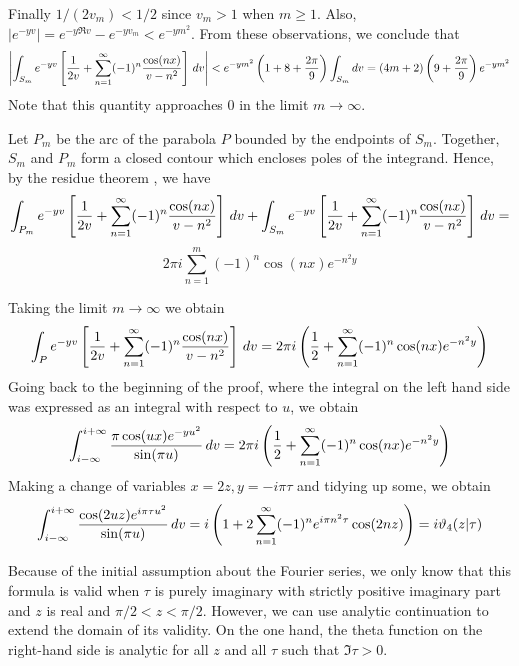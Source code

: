 \documentclass[12pt]{article}
\begin{document}
Finally $1/(2 v_m) < 1/2$ since $v_m > 1$ when $m \ge 1$.  Also, $|e^{-y v}| = e^{-y \Re v} - e^{-y v_m} < e^{-y m^2}$.  From these observations, we conclude that
 $$\left| \int_{S_m} e^{-y v} \left[ {1 \over 2 v} + \sum_{n=1}^\infty (-1)^n {\cos(nx)\over v - n^2} \right] \, dv \right| < e^{-y m^2} \left( 1 + 8 + {2 \pi \over 9} \right) \int_{S_m} dv = (4m + 2) \left( 9 + {2 \pi \over 9} \right) e^{-y m^2}$$
Note that this quantity approaches 0 in the limit $m \to \infty$.

Let $P_m$ be the arc of the parabola $P$ bounded by the endpoints of $S_m$.  Together, $S_m$ and $P_m$ form a closed contour which encloses poles of the integrand.  Hence, by the residue theorem , we have 
 $$\int_{P_m} e^{-y v} \left[ {1 \over 2 v} + \sum_{n=1}^\infty (-1)^n {\cos(nx)\over v - n^2} \right] \, dv + \int_{S_m} e^{-y v} \left[ {1 \over 2 v} + \sum_{n=1}^\infty (-1)^n {\cos(nx)\over v - n^2} \right] \, dv =$$
 $$2 \pi i \sum_{n = 1}^m (-1)^n \cos(nx) e^{-n^2 y}$$

Taking the limit $m \to \infty$ we obtain
 $$\int_{P} e^{-y v} \left[ {1 \over 2 v} + \sum_{n=1}^\infty (-1)^n {\cos(nx)\over v - n^2} \right] \, dv = 2 \pi i \left( {1 \over 2} + \sum_{n = 1}^\infty (-1)^n \cos(nx) e^{-n^2 y} \right)$$
Going back to the beginning of the proof, where the integral on the left hand side was expressed as an integral with respect to $u$, we obtain
 $$\int_{i-\infty}^{i + \infty} {\pi \cos (u x) e^{-yu^2} \over \sin (\pi u)} \, dv = 2 \pi i \left( {1 \over 2} + \sum_{n = 1}^\infty (-1)^n \cos(nx) e^{-n^2 y} \right)$$
 Making a change of variables $x = 2z, y = -i \pi \tau$ and tidying up some, we obtain
 $$\int_{i-\infty}^{i + \infty} {\cos (2 u z) e^{i \pi \tau u^2} \over \sin (\pi u)} \, dv = i \left( 1 + 2 \sum_{n = 1}^\infty (-1)^n e^{i \pi n^2 \tau} \cos(2 n z) \right) = i \vartheta_4 (z | \tau)$$

Because of the initial assumption about the Fourier series, we only know that this formula is valid when $\tau$ is purely imaginary with strictly positive imaginary part and $z$ is real and $\pi/2 < z < \pi/2$.  However, we can use analytic continuation to extend the domain of its validity.  On the one hand, the theta function on the right-hand side is analytic for all $z$ and all $\tau$ such that $\Im \tau > 0$.
\end{document}
